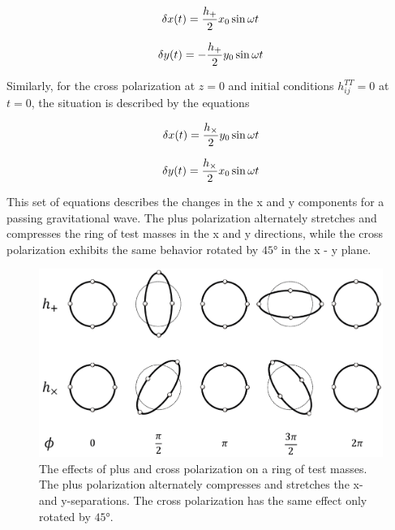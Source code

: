 \documentclass[binding=0.6cm, LaM]{sapthesis}
\begin{document}
		\begin{equation}
		\delta x(t) =  {{h_{+}} \over 2} x_0 \sin \omega t
		\end{equation}

		\begin{equation}
		\delta y(t) = - {{h_{+}} \over 2} y_0  \sin \omega t
		\end{equation}

	Similarly, for the cross polarization at $z=0$ and initial conditions $h_{ij}^{TT} = 0$ at $t= 0$, the situation is described by the equations
		
		\begin{equation}
		\delta x(t) =  {{h_{\times}} \over 2} y_0 \sin \omega t
		\end{equation}

		\begin{equation}
		\delta y(t) =  {{h_{\times}} \over 2} x_0  \sin \omega t
		\end{equation}
		
	This set of equations describes the changes in the x and y components for a passing gravitational wave.
	The plus polarization alternately stretches and compresses the ring of test masses in the x and y directions, 
	while the cross polarization exhibits the same behavior rotated by $\ang{45}$ in the x - y plane.

		\begin{figure}
		\includegraphics[scale=1]{ring}
		\centering
		\caption{The effects of plus and cross polarization on a ring of test masses. 
			 The plus polarization alternately compresses and stretches the x- and y-separations.
			 The cross polarization has the same effect only rotated by  $\ang{45}$.}
		\label{fig:ring}
		\end{figure}
\end{document}
